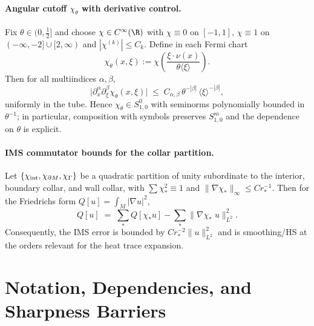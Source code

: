 \paragraph{Angular cutoff $\chi_\theta$ with derivative control.}
Fix $\theta\in(0,\tfrac12]$ and choose $\chi\in C^\infty(\R)$ with $\chi\equiv 0$ on $[-1,1]$, $\chi\equiv 1$ on $(-\infty,-2]\cup [2,\infty)$ and $|\chi^{(k)}|\le C_k$. Define in each Fermi chart
\[
\chi_\theta(x,\xi):=\chi\!\left(\frac{\xi\cdot \nu(x)}{\theta \langle \xi\rangle}\right).
\]
Then for all multiindices $\alpha,\beta$,
\[
\big|\partial_x^\alpha\partial_\xi^\beta \chi_\theta(x,\xi)\big|
\;\le\; C_{\alpha,\beta}\,\theta^{-|\beta|}\,\langle \xi\rangle^{-|\beta|},
\]
uniformly in the tube. Hence $\chi_\theta\in S^{0}_{1,0}$ with seminorms polynomially bounded in $\theta^{-1}$; in particular, composition with symbols preserves $S^m_{1,0}$ and the dependence on $\theta$ is explicit.

\paragraph{IMS commutator bounds for the collar partition.}
Let $\{\chi_{\rm int},\chi_{\partial M},\chi_\Gamma\}$ be a quadratic partition of unity subordinate to the interior, boundary collar, and wall collar, with $\sum \chi_\ast^2\equiv 1$ and $\|\nabla \chi_\ast\|_\infty\le C r_*^{-1}$. Then for the Friedrichs form $Q[u]=\int_M |\nabla u|^2$,
\[
Q[u]\;=\;\sum_\ast Q[\chi_\ast u] - \sum_\ast \|\nabla \chi_\ast\;u\|_{L^2}^2.
\]
Consequently, the IMS error is bounded by $C r_*^{-2}\|u\|_{L^2}^2$ and is smoothing/HS at the orders relevant for the heat trace expansion.

\section{Notation, Dependencies, and Sharpness Barriers}
\label{sec:notation-audit}

